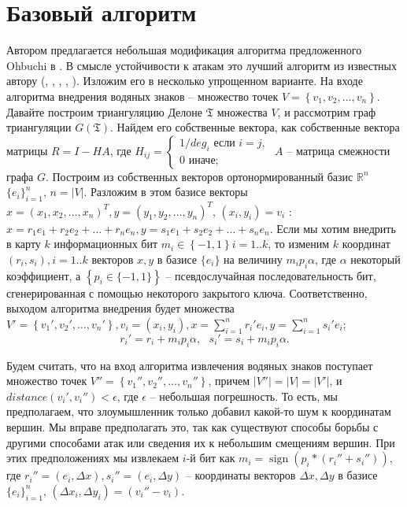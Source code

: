 \documentclass{article}
\newcommand{\sgn}{\operatorname{sign}}
\begin{document}
\section{Базовый алгоритм}
Автором предлагается небольшая модификация алгоритма предложенного Ohbuchi в \cite{Ohbuchi}. В смысле устойчивости к атакам это лучший алгоритм
из известных автору (\cite{Bazin}, \cite{Voight}, \cite{Kim}, \cite{Chang}, \cite{Li}). Изложим его в несколько упрощенном варианте.
На входе алгоритма внедрения водяных знаков -- множество точек $V = \left\{v_1, v_2, ... , v_n\right\}$. Давайте построим триангуляцию Делоне $\mathfrak{T}$ множества $V$, и рассмотрим граф триангуляции $G(\mathfrak{T})$. Найдем его собственные вектора, как собственные вектора матрицы $R = I - HA$, где 
$H_{ij} = \begin{cases} 1 / deg_i\mbox{ если }i = j, \\ 0\mbox{ иначе;} \end{cases}$ $A$ -- матрица смежности графа $G$. Построим из собственных векторов ортонормированный базис $\mathbb{R}^n$ 
$\{e_i\}_{i=1}^n$, $n = |V|$. Разложим в этом базисе векторы $x = (x_1, x_2, \dots, x_n)^T, y = (y_1, y_2, \dots, y_n)^T$, $(x_i, y_i) = v_i$ : 
$x = r_1 e_1 + r_2 e_2 + \dots + r_n e_n, y = s_1 e_1 + s_2 e_2 + \dots + s_n e_n$. 
Если мы хотим внедрить в карту $k$  информационных бит $m_i \in \left\{-1, 1 \right\} i = 1..k$, то изменим $k$ координат $(r_i, s_i), i = 1..k$ 
векторов $x, y$ в базисе $\{e_i\}$ на величину $m_i p_i \alpha$, где $\alpha$ некоторый коэффициент, а $\left\{p_i \in \{-1, 1\} \right\}$ -- псевдослучайная последовательность бит, 
сгенерированная с помощью некоторого закрытого ключа. Соответственно, выходом алгоритма внедрения будет множества $V' = \left\{ v_1', v_2', \dots , v_n' \right\}, v_i = (x_i, y_i), 
x = \sum_{i=1}^n r_i' e_i, y = \sum_{i=1}^n s_i' e_i$; \begin{equation}\label{MainFormul} r_i' = r_i + m_i p_i \alpha,\mbox{  } s_i' = s_i + m_i p_i \alpha. \end{equation}

Будем считать, что на вход алгоритма извлечения водяных знаков поступает множество точек $V'' = \left\{v_1'', v_2'', \dots , v_n''\right\}$, причем $|V''| = |V| = |V'|$, и 
$distance(v_i', v_i'') < \epsilon$, где $\epsilon$ -- небольшая погрешность. То есть, мы предполагаем, что злоумышленник только добавил какой-то шум к координатам вершин. Мы вправе предполагать это, так как существуют способы борьбы с другими способами атак или сведения их к небольшим смещениям вершин. При этих предположениях мы извлекаем $i$-й бит как
$m_i = \sgn( p_i * ( r_i'' + s_i'') )$, где $r_i'' = (e_i, \Delta x), s_i'' = (e_i, \Delta y)$ -- координаты векторов $\Delta x, \Delta y$ в базисе $\{e_i\}_{i=1}^n$, 
$(\Delta x_i, \Delta y_i) = (v_i'' - v_i)$. 
\end{document}
